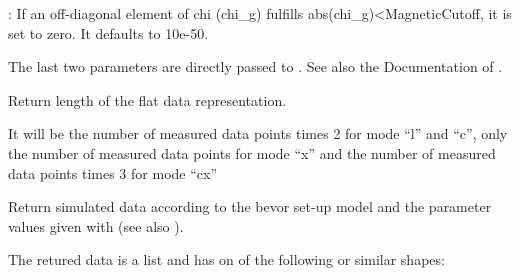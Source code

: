 \documentclass[letterpaper,10pt,english]{sphinxmanual}
\begin{document}
\begin{fulllineitems}
\begin{fulllineitems}
: If an off-diagonal element of chi (chi\_g) fulfills abs(chi\_g)\textless{}MagneticCutoff, it is set to zero. It defaults to 10e-50.

The last two parameters are directly passed to . See also the Documentation of .

\end{fulllineitems}


\begin{fulllineitems}
\label{\detokenize{modules-api/experiment:Experiment.ReflDataSimulator.getLenDataFlat}}
Return length of the flat data representation.

It will be the number of measured data points times 2 for mode “l” and “c”, only the number of measured data points for mode “x” and the number of measured data points times 3 for mode “cx”

\end{fulllineitems}


\begin{fulllineitems}
\label{\detokenize{modules-api/experiment:Experiment.ReflDataSimulator.getSimData}}
Return simulated data according to the bevor set-up model and the parameter values given with  (see also {\hyperref[\detokenize{modules-api/parameters:module-Parameters}]{}}).

The retured data is a list and has on of the following or similar shapes:


\end{fulllineitems}
\end{fulllineitems}
\end{document}
